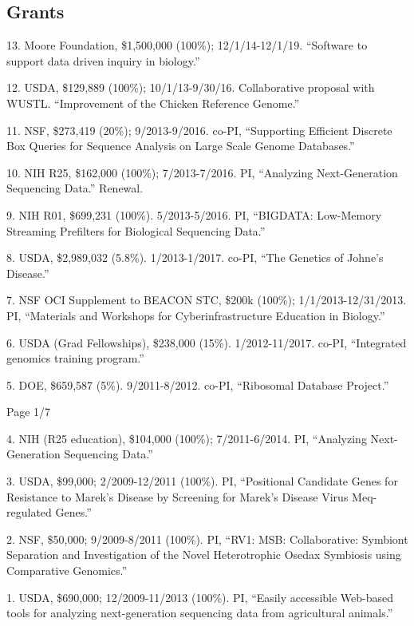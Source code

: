 \documentclass[margin,line]{resume}
\begin{document}
\begin{resume}
    \section{\mysidestyle Grants}

13. Moore Foundation, \$1,500,000 (100\%); 12/1/14-12/1/19.  ``Software to support data driven inquiry in biology.''

12. USDA, \$129,889 (100\%); 10/1/13-9/30/16.  Collaborative proposal with WUSTL. ``Improvement of the Chicken Reference Genome.''

11. NSF, \$273,419 (20\%); 9/2013-9/2016. co-PI, ``Supporting Efficient Discrete Box Queries for Sequence Analysis on Large Scale Genome Databases.''

10. NIH R25, \$162,000 (100\%); 7/2013-7/2016.  PI, ``Analyzing Next-Generation Sequencing Data.'' Renewal.

9. NIH R01, \$699,231 (100\%). 5/2013-5/2016. PI, ``BIGDATA: Low-Memory Streaming Prefilters for Biological Sequencing Data.''

8. USDA, \$2,989,032 (5.8\%). 1/2013-1/2017.  co-PI, ``The Genetics of Johne's Disease.''

7. NSF OCI Supplement to BEACON STC, \$200k (100\%); 1/1/2013-12/31/2013.  PI, ``Materials and Workshops for Cyberinfrastructure Education in Biology.''

6. USDA (Grad Fellowships), \$238,000 (15\%).  1/2012-11/2017.  co-PI, ``Integrated genomics training program.''

5. DOE, \$659,587 (5\%).  9/2011-8/2012.  co-PI, ``Ribosomal Database Project.''

\vspace{2cm}
{\centerline {Page 1/7}}

\newpage

4. NIH (R25 education), \$104,000 (100\%); 7/2011-6/2014.  PI, ``Analyzing Next-Generation Sequencing Data.''

3. USDA, \$99,000; 2/2009-12/2011 (100\%).  PI, ``Positional Candidate Genes for Resistance to Marek's
Disease by Screening for Marek's Disease Virus Meq-regulated Genes.''

2. NSF, \$50,000; 9/2009-8/2011 (100\%).  PI, ``RV1: MSB: Collaborative: Symbiont Separation and Investigation of the Novel Heterotrophic Osedax Symbiosis using Comparative Genomics.''

1. USDA, \$690,000; 12/2009-11/2013 (100\%).  PI, ``Easily accessible Web-based tools for analyzing next-generation sequencing data from agricultural animals.''


\end{resume}
\end{document}
